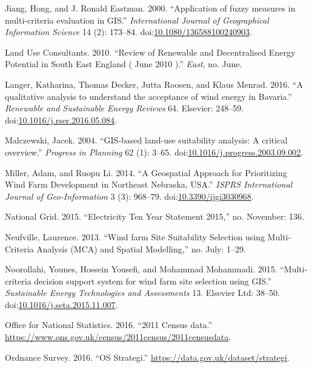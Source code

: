 \documentclass[a4paper,]{article}
\theoremstyle{definition}
\theoremstyle{definition}
\theoremstyle{remark}
\begin{document}
{\hypertarget{ref-Jiang2000}{}
Jiang, Hong, and J. Ronald Eastman. 2000. ``Application of fuzzy
measures in multi-criteria evaluation in GIS.'' \emph{International
Journal of Geographical Information Science} 14 (2): 173--84.
doi:\href{https://doi.org/10.1080/136588100240903}{10.1080/136588100240903}.

\hypertarget{ref-LandUseConsultants2010}{}
Land Use Consultants. 2010. ``Review of Renewable and Decentralised
Energy Potential in South East England ( June 2010 ).'' \emph{East}, no.
June.

\hypertarget{ref-Langer2016a}{}
Langer, Katharina, Thomas Decker, Jutta Roosen, and Klaus Menrad. 2016.
``A qualitative analysis to understand the acceptance of wind energy in
Bavaria.'' \emph{Renewable and Sustainable Energy Reviews} 64. Elsevier:
248--59.
doi:\href{https://doi.org/10.1016/j.rser.2016.05.084}{10.1016/j.rser.2016.05.084}.

\hypertarget{ref-Malczewski2004}{}
Malczewski, Jacek. 2004. ``GIS-based land-use suitability analysis: A
critical overview.'' \emph{Progress in Planning} 62 (1): 3--65.
doi:\href{https://doi.org/10.1016/j.progress.2003.09.002}{10.1016/j.progress.2003.09.002}.

\hypertarget{ref-Miller2014}{}
Miller, Adam, and Ruopu Li. 2014. ``A Geospatial Approach for
Prioritizing Wind Farm Development in Northeast Nebraska, USA.''
\emph{ISPRS International Journal of Geo-Information} 3 (3): 968--79.
doi:\href{https://doi.org/10.3390/ijgi3030968}{10.3390/ijgi3030968}.

\hypertarget{ref-NationalGrid2015}{}
National Grid. 2015. ``Electricity Ten Year Statement 2015,'' no.
November: 136.

\hypertarget{ref-Neufville2013}{}
Neufville, Laurence. 2013. ``Wind farm Site Suitability Selection using
Multi-Criteria Analysis (MCA) and Spatial Modelling,'' no. July: 1--29.

\hypertarget{ref-Noorollahi2015}{}
Noorollahi, Younes, Hossein Yousefi, and Mohammad Mohammadi. 2015.
``Multi-criteria decision support system for wind farm site selection
using GIS.'' \emph{Sustainable Energy Technologies and Assessments} 13.
Elsevier Ltd: 38--50.
doi:\href{https://doi.org/10.1016/j.seta.2015.11.007}{10.1016/j.seta.2015.11.007}.

\hypertarget{ref-OfficeforNationalStatistics}{}
Office for National Statistics. 2016. ``2011 Census data.''
\url{https://www.ons.gov.uk/census/2011census/2011censusdata}.

\hypertarget{ref-Survey2016}{}
Ordnance Survey. 2016. ``OS Strategi.''
\url{https://data.gov.uk/dataset/strategi}.

}
\end{document}
